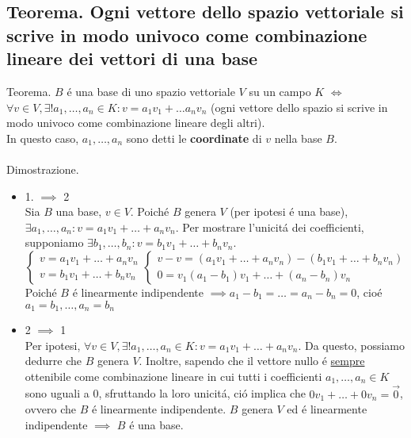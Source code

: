 \documentclass{article}
\begin{document}
\subsection{Teorema. Ogni vettore dello spazio vettoriale si scrive in modo univoco come combinazione lineare dei vettori di una base}
Teorema. $B$ é una base di uno spazio vettoriale $V$ su un campo $K$ $\iff$ $\forall v \in V, \exists! a_1, \dots, a_n \in K : v = a_1v_1 + \dots a_nv_n$ (ogni vettore dello spazio si scrive in modo univoco come combinazione lineare degli altri).\\
In questo caso, $a_1, \dots, a_n$ sono detti le \textbf{coordinate} di $v$ nella base $B$.\\\\
Dimostrazione.
\begin{itemize}
	\item 1. $\implies$ 2\\
Sia $B$ una base, $v \in V$. Poiché $B$ genera $V$ (per ipotesi é una base), $\exists a_1, \dots, a_n : v = a_1v_1 + \dots + a_nv_n$. Per mostrare l'unicitá dei coefficienti, supponiamo $\exists b_1, \dots, b_n : v= b_1v_1 + \dots + b_nv_n$.\\
\begin{equation}
	\begin{cases}
		v = a_1v_1 + \dots + a_nv_n \\
		v = b_1v_1 + \dots + b_nv_n
	\end{cases}
	\begin{cases}
		v - v = (a_1v_1 + \dots + a_nv_n) - (b_1v_1 + \dots + b_nv_n) \\
		0 = v_1 (a_1 - b_1)v_1 + \dots + (a_n - b_n)v_n
	\end{cases}
\end{equation}
Poiché $B$ é linearmente indipendente $\implies a_1-b_1 = \dots = a_n - b_n = 0$, cioé $a_1 = b_1, \dots, a_n = b_n$
	\item 2 $\implies$ 1\\
Per ipotesi, $\forall v \in V, \exists! a_1, \dots, a_n \in K : v = a_1v_1 + \dots + a_nv_n$. Da questo, possiamo dedurre che $B$ genera $V$. Inoltre, sapendo che il vettore nullo é \underline{sempre} ottenibile come combinazione lineare in cui tutti i coefficienti $a_1, \dots, a_n \in K$ sono uguali a 0, sfruttando la loro unicitá, ció implica che $0v_1 + \dots + 0v_n = \vec{0}$, ovvero che $B$ é linearmente indipendente. $B$ genera $V$ ed é linearmente indipendente $\implies$ $B$ é una base.
\end{itemize}
\end{document}
